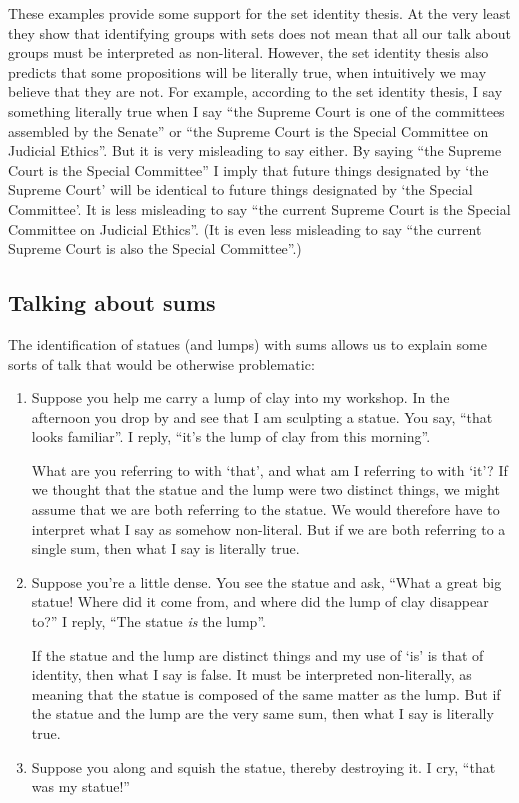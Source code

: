 \documentclass[11pt]{article}
\begin{document}
\begin{spacing}{1.5}
These examples provide some support for the set identity thesis.  At
the very least they show that identifying groups with sets does not
mean that all our talk about groups must be interpreted as
non-literal.  However, the set identity thesis also predicts that some
propositions will be literally true, when intuitively we may believe
that they are not.  For example, according to the set identity thesis,
I say something literally true when I say ``the Supreme Court is one
of the committees assembled by the Senate'' or ``the Supreme Court is
the Special Committee on Judicial Ethics''.  But it is very misleading
to say either.  By saying ``the Supreme Court is the Special
Committee'' I imply that future things designated by `the Supreme
Court' will be identical to future things designated by `the Special
Committee'.  It is less misleading to say ``the current Supreme Court
is the Special Committee on Judicial Ethics''.  (It is even less
misleading to say ``the current Supreme Court is also the Special
Committee''.)

\subsection{Talking about sums}
\label{sums-talk}
The identification of statues (and lumps) with sums allows us to
explain some sorts of talk that would be otherwise problematic:

\begin{enumerate}
  \item Suppose you help me carry a lump of clay into my workshop.  In
    the afternoon you drop by and see that I am sculpting a statue.
    You say, ``that looks familiar''.  I reply, ``it's the lump of
    clay from this morning''.

    What are you referring to with `that', and what am I referring to
    with `it'?  If we thought that the statue and the lump were two
    distinct things, we might assume that we are both referring to the
    statue.  We would therefore have to interpret what I say as
    somehow non-literal.  But if we are both referring to a single
    sum, then what I say is literally true.

  \item Suppose you're a little dense.  You see the statue and ask,
    ``What a great big statue!  Where did it come from, and where did
    the lump of clay disappear to?''  I reply, ``The statue {\em is}
    the lump''.

    If the statue and the lump are distinct things and my use of `is'
    is that of identity, then what I say is false.  It must be
    interpreted non-literally, as meaning that the statue is composed
    of the same matter as the lump.  But if the statue and the lump
    are the very same sum, then what I say is literally true.
  \item Suppose you along and squish the statue, thereby destroying
    it.  I cry, ``that was my statue!''


\end{enumerate}
\end{spacing}
\end{document}
